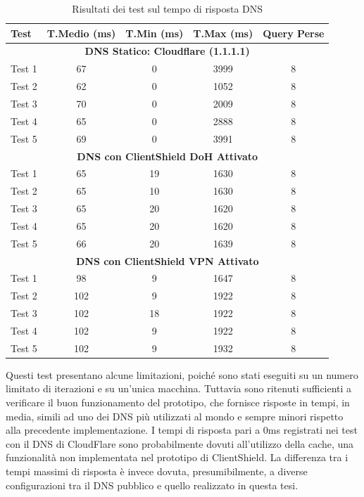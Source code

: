 \documentclass[12pt,a4paper,openright,twoside]{book}
\begin{document}
\begin{table}[h]
	\centering
	\renewcommand{\arraystretch}{1.3} %
	\setlength{\tabcolsep}{10pt} %
	\begin{tabular}{lcccc}
		\toprule
		\textbf{Test} & \textbf{T.Medio (ms)} & \textbf{T.Min (ms)} & \textbf{T.Max (ms)} & \textbf{Query Perse} \\
		\midrule
		\multicolumn{5}{c}{\textbf{DNS Statico: Cloudflare (1.1.1.1)}} \\
		\midrule
		Test 1 & 67 & 0 & 3999 & 8 \\
		Test 2 & 62 & 0 & 1052 & 8 \\
		Test 3 & 70 & 0 & 2009 & 8 \\
		Test 4 & 65 & 0 & 2888 & 8 \\
		Test 5 & 69 & 0 & 3991 & 8 \\
		\midrule
		\multicolumn{5}{c}{\textbf{DNS con ClientShield DoH Attivato}} \\
		\midrule
		Test 1 & 65 & 19 & 1630 & 8 \\
		Test 2 & 65 & 10 & 1630 & 8 \\
		Test 3 & 65 & 20 & 1620 & 8 \\
		Test 4 & 65 & 20 & 1620 & 8 \\
		Test 5 & 66 & 20 & 1639 & 8 \\
		\midrule
		\multicolumn{5}{c}{\textbf{DNS con ClientShield VPN Attivato}} \\
		\midrule
		Test 1 & 98 & 9 & 1647 & 8 \\
		Test 2 & 102 & 9 & 1922 & 8 \\
		Test 3 & 102 & 18 & 1922 & 8 \\
		Test 4 & 102 & 9 & 1922 & 8 \\
		Test 5 & 102 & 9 & 1932 & 8 \\
		\bottomrule
	\end{tabular}
	\caption{Risultati dei test sul tempo di risposta DNS}
	\label{tab:dns-tests}
\end{table}
Questi test presentano alcune limitazioni, poiché sono stati eseguiti su un numero limitato di iterazioni e su un'unica macchina.
Tuttavia sono ritenuti sufficienti a verificare il buon funzionamento del prototipo, che fornisce risposte in tempi, in media, simili ad uno dei \gls{DNS} più utilizzati al mondo e sempre minori rispetto alla precedente implementazione.
I tempi di risposta pari a 0ms registrati nei test con il \gls{DNS} di CloudFlare sono probabilmente dovuti all'utilizzo della cache, una funzionalità non implementata nel prototipo di ClientShield.
La differenza tra i tempi massimi di risposta è invece dovuta, presumibilmente, a diverse configurazioni tra il \gls{DNS} pubblico e quello realizzato in questa tesi.
\end{document}
